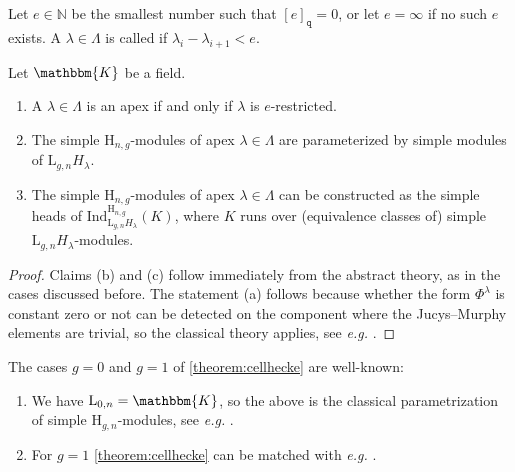 \documentclass[a4paper,11pt]{amsart}
\let\emph\relax
\newcommand{\eg}{\textsl{e.g.}}
\newcommand{\setstuff}[1]{\mathrm{#1}}
\newcommand{\KK}{\mathbbm{K}}
\newcommand{\N}{\mathbb{N}}
\newcommand{\varsym}[1]{\mathtt{#1}}
\newcommand{\qvar}{\varsym{q}}
\numberwithin{equation}{section}
\let\fullref\autoref
\begin{document}
Let $e\in\N$ be the smallest number such that 
$[e]_{\qvar}=0$, or let $e=\infty$ if no such 
$e$ exists. A $\lambda\in\Lambda$ is called 
\emph{$e$-restricted} if $\lambda_{i}-\lambda_{i+1}<e$.

\begin{theorem}\label{theorem:cellhecke}
Let $\KK$ be a field.
\begin{enumerate}

\item A $\lambda\in\Lambda$ is an apex 
if and only if $\lambda$ is $e$-restricted.

\item The simple $\setstuff{H}_{n,g}$-modules of 
apex $\lambda\in\Lambda$ 
are parameterized by simple modules of $\setstuff{L}_{g,n}H_{\lambda}$.

\item The simple $\setstuff{H}_{n,g}$-modules of 
apex $\lambda\in\Lambda$ can be constructed as 
the simple heads of
$\mathrm{Ind}_{\setstuff{L}_{g,n}H_{\lambda}}^{\setstuff{H}_{n,g}}(K)$, 
where $K$ runs over (equivalence classes of) 
simple $\setstuff{L}_{g,n}H_{\lambda}$-modules.

\end{enumerate}
\end{theorem}

\begin{proof}
Claims (b) and (c) follow immediately from the abstract theory, as 
in the cases discussed before. The statement (a) follows 
because whether the form $\Phi^{\lambda}$ is constant 
zero or not can be detected on the component where the Jucys--Murphy 
elements are trivial, so the classical theory applies, see {\eg} 
\cite[Section 3.4]{Ma-hecke-schur}.
\end{proof}

\begin{example}
The cases $g=0$ and $g=1$ of \fullref{theorem:cellhecke}
are well-known:
\begin{enumerate}

\item We have $\setstuff{L}_{0,n}=\KK$, so the above 
is the classical parametrization 
of simple $\setstuff{H}_{g,n}$-modules, see {\eg} 
\cite[Section 3.4]{Ma-hecke-schur}.

\item For $g=1$ \fullref{theorem:cellhecke}
can be matched with {\eg} \cite[Theorem 5.8]{KoXi-affine-cellular}.

\end{enumerate}
\end{example}
\end{document}
